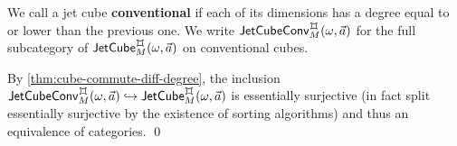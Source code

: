 \documentclass[a4paper]{memoir}
\begin{document}
\begin{definition} \label{def:conv-jet-cube-cat}
	We call a jet cube \textbf{conventional} if each of its dimensions has a degree equal to or lower than the previous one.
	We write $\convjetcube{\myorix}{\mycubex}{M}{\vec a}$ for the full subcategory of $\jetcube{\myorix}{\mycubex}{M}{\vec a}$ on conventional cubes.
\end{definition}
\begin{corollary} \label{thm:conv-jet-cube-cat}
	By \cref{thm:cube-commute-diff-degree}, the inclusion $\convjetcube{\myorix}{\mycubex}{M}{\vec a} \hookrightarrow \jetcube{\myorix}{\mycubex}{M}{\vec a}$ is essentially surjective (in fact split essentially surjective by the existence of sorting algorithms) and thus an equivalence of categories. \qed
\end{corollary}
\end{document}
